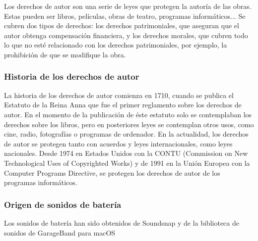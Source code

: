 \documentclass{article}
\begin{document}
            Los derechos de autor son una serie de leyes que protegen la autoría de las obras. Estas pueden ser libros,
            películas, obras de teatro, programas informáticos...\newline
            Se cubren dos tipos de derechos: los derechos patrimoniales, que aseguran que el autor obtenga compensación
            financiera, y los derechos morales, que cubren todo lo que no esté relacionado con los derechos
            patrimoniales, por ejemplo, la prohibición de que se modifique la obra.\cite{derechos_ompi}


        \subsubsection{Historia de los derechos de autor} %
        \label{ssub:HistoriaDeLosDerechosDeAutor}

            La historia de los derechos de autor comienza en 1710, cuando se publica el Estatuto de la Reina
            Anna\cite{estatuto_anna} que fue el primer reglamento sobre los derechos de autor. En el momento de la
            publicación de éste estatuto solo se contemplaban los derechos sobre los libros, pero en posteriores leyes
            se contemplan otros usos, como cine, radio, fotografías o programas de ordenador.\newline
            En la actualidad, los derechos de autor se protegen tanto con acuerdos y leyes internacionales, como leyes
            nacionales.\newline
            Desde 1974 en Estados Unidos con la CONTU\cite{contu} (Commission on New Technological Uses of Copyrighted
            Works) y de 1991 en la Unión Europea con la Computer Programs Directive\cite{com_pro_dir}, se protegen los
            derechos de autor de los programas informáticos.


        \subsubsection{Origen de sonidos de batería} %
        \label{ssub:OrigenDeSonidosDeBateria}

            Los sonidos de batería han sido obtenidos de Soundsnap\cite{soundsnap} y de la biblioteca de sonidos de
            GarageBand para macOS\cite{garageband}
\end{document}
